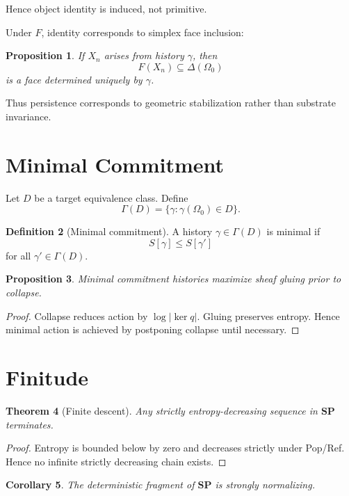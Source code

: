 \documentclass[12pt,a4paper]{article}
\newtheorem{theorem}{Theorem}[section]
\newtheorem{proposition}[theorem]{Proposition}
\newtheorem{corollary}[theorem]{Corollary}
\theoremstyle{definition}
\newtheorem{definition}[theorem]{Definition}
\theoremstyle{remark}
\newcommand{\SP}{\mathbf{SP}}
\begin{document}
Hence object identity is induced, not primitive.

Under $F$, identity corresponds to simplex face inclusion:

\begin{proposition}
If $X_n$ arises from history $\gamma$, then
\[
  F(X_n) \subseteq \Delta(\Omega_0)
\]
is a face determined uniquely by $\gamma$.
\end{proposition}

Thus persistence corresponds to geometric stabilization rather than
substrate invariance.

\section{Minimal Commitment}
\label{sec:minimal}

Let $D$ be a target equivalence class. Define
\[
  \Gamma(D) = \{\gamma : \gamma(\Omega_0) \in D\}.
\]

\begin{definition}[Minimal commitment]
A history $\gamma \in \Gamma(D)$ is minimal if
\[
  S[\gamma] \le S[\gamma']
\]
for all $\gamma' \in \Gamma(D)$.
\end{definition}

\begin{proposition}
Minimal commitment histories maximize sheaf gluing prior to collapse.
\end{proposition}

\begin{proof}
Collapse reduces action by $\log|\ker q|$.
Gluing preserves entropy.
Hence minimal action is achieved by postponing collapse until necessary.
\end{proof}

\section{Finitude}
\label{sec:finitude}

\begin{theorem}[Finite descent]
Any strictly entropy-decreasing sequence in $\SP$ terminates.
\end{theorem}

\begin{proof}
Entropy is bounded below by zero and decreases strictly under Pop/Ref.
Hence no infinite strictly decreasing chain exists.
\end{proof}

\begin{corollary}
The deterministic fragment of $\SP$ is strongly normalizing.
\end{corollary}
\end{document}
